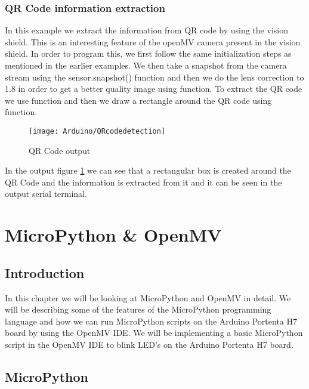 \subsection{QR Code information extraction}
In this example we extract the information from QR code by using the vision shield.  This is an interesting feature of the openMV camera present in the vision shield. In order to program this, we first follow the same initialization steps as mentioned in the earlier examples.  We then take a snapshot from the camera stream using the sensor.snapshot() function and then we do the lens correction to 1.8 in order to get a better quality image using  function.  To extract the QR code we use  function and then we draw a rectangle around the QR code using  function.
\begin{figure}[H]
	\centering
	\texttt{[image: Arduino/QRcodedetection]}
	\caption{QR Code output}
	\label{figure 6.13}
\end{figure}
In the output figure \ref{figure 6.13} we can see that a rectangular box is created around the QR Code and the information is extracted from it and it can be seen in the output serial terminal.








\chapter{MicroPython \& OpenMV}
\section{Introduction}
In this chapter we will be looking at MicroPython and OpenMV in detail. We will be describing some of the features of the MicroPython programming language and how we can run MicroPython scripts on the Arduino Portenta H7 board by using the OpenMV IDE. We will be implementing a basic MicroPython script in the OpenMV IDE to blink LED's on the Arduino Portenta H7 board.

\section{MicroPython}

